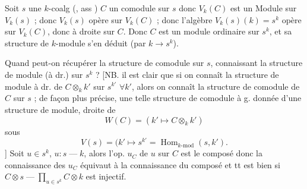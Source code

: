 
Soit $s$ une $k$-coalg (, ass )
$C$ un comodule  sur $s$
donc $V_k(C)$ est un Module  sur $V_k(s)$ ;  donc  $V_k(s)$ opère  sur $V_k(C)$ ; donc l'algèbre $V_k(s)(k)=s^k$ opère  sur $V_k(C)$, donc à droite sur $C$. Donc $C$ est un module  ordinaire sur $s^k$, et sa structure de $k$-module s'en déduit (par $k\longrightarrow s^k$).

Quand peut-on récupérer la structure de comodule  sur $s$, connaissant la structure de module (à dr.) sur $s^k$ ? [NB. il est clair que si on connaît la structure de module à dr. de $C\otimes_k k'$ sur $s^{k'}$ $\forall k'$, alors on connaît la structure de comodule de $C$ sur $s$ ; de façon plus précise, une telle structure de comodule à g.   donnée d'une structure de module, droite de
\[
W(C)=(k'\longmapsto C\otimes_k k')
\]
sous
\[
V(s)=(k'\longmapsto s^{k'}=\operatorname{Hom}_{k\text{-mod}}(s,k').
\]
] Soit $u\in s^k$, $u:s\mathbin{\text{---}}k$, alors l'op. $u_C$ de $u$ sur $C$ est le composé
donc la connaissance des $u_C$ équivaut à la connaissance du composé
et tt est bien si $C\otimes s\mathbin{\text{---}}\prod_{u\in s^k}C\otimes k$ est injectif.
